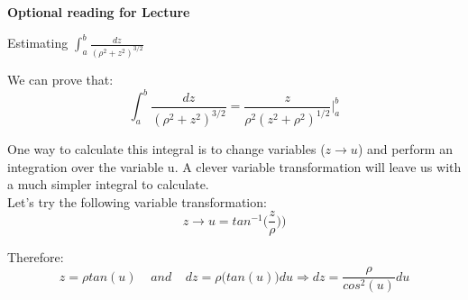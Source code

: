 


\begin{frame}[plain,c]
\begin{center}
{\Huge \bf Optional reading for Lecture \thislecture}
\end{center}
\end{frame}

%
%
%

\begin{frame}{Estimating $\int_{a}^{b} \frac{dz}{({\rho}^2+z^2)^{3/2}}$}

We can prove that:
\begin{equation*}
  \int_{a}^{b} \frac{dz}{({\rho}^2+z^2)^{3/2}} = \frac{z}{{\rho}^{2}(z^{2}+{\rho}^{2})^{1/2}} \biggr\rvert_{a}^{b}
\end{equation*}

\vspace{0.2cm}

{\small
One way to calculate this integral is to change variables ($z \rightarrow u$) and perform an integration over the variable u.
A clever variable transformation will leave us with a much simpler integral to calculate.\\

Let's try the following variable transformation:
\begin{equation*}
  z \rightarrow u = tan^{-1}\Big(\frac{z}{{\rho}})\Big)
\end{equation*}

Therefore:
\begin{equation*}
   z = {\rho} tan(u) \;\;\;\; and \;\;\;\;
  dz = {\rho} \Big( tan(u) \Big) du \Rightarrow dz = \frac{{\rho}}{cos^{2}(u)} du
\end{equation*}
}
\end{frame}

%
%
%

